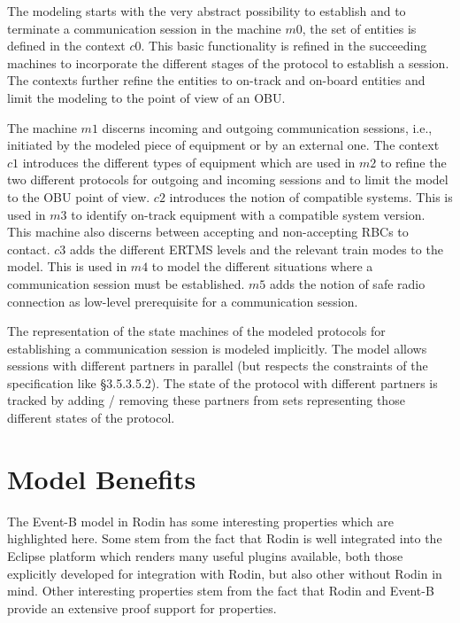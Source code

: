 \documentclass{template/openetcs_article}
\begin{document}
The modeling starts with the very abstract possibility to establish and to
terminate a communication session in the machine $m0$, the set of entities is
defined in the context $c0$. This basic functionality is refined in the
succeeding machines to incorporate the different stages of the protocol to
establish a session. The contexts further refine the entities to on-track and
on-board entities and limit the modeling to the point of view of an OBU.

The machine $m1$ discerns incoming and outgoing communication sessions, i.e.,
initiated by the modeled piece of equipment or by an external one. The context
$c1$ introduces the different types of equipment which are used in $m2$ to
refine the two different protocols for outgoing and incoming sessions and to
limit the model to the OBU point of view. $c2$ introduces the notion of
compatible systems. This is used in $m3$ to identify on-track equipment with a
compatible system version. This machine also discerns between accepting and
non-accepting RBCs to contact. $c3$ adds the different ERTMS levels and the
relevant train modes to the model. This is used in $m4$ to model the different
situations where a communication session must be established. $m5$ adds the
notion of safe radio connection as low-level prerequisite for a communication
session.

The representation of the state machines of the modeled protocols for
establishing a communication session is modeled implicitly. The model allows
sessions with different partners in parallel (but respects the constraints of
the specification like §3.5.3.5.2). The state of the protocol with different
partners is tracked by adding / removing these partners from sets representing
those different states of the protocol.

\section{Model Benefits}
\label{sec:model-highlights}

The Event-B model in Rodin has some interesting properties which are highlighted
here. Some stem from the fact that Rodin is well integrated into the Eclipse
platform which renders many useful plugins available, both those explicitly
developed for integration with Rodin, but also other without Rodin in mind.
Other interesting properties stem from the fact that Rodin and Event-B provide
an extensive proof support for properties.
\end{document}
